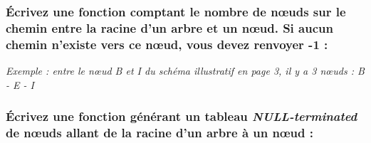 \documentclass[11pt,a4paper]{article}
\begin{document}
%


\subsubsection{\'Ecrivez une fonction comptant le nombre de nœuds sur le chemin entre la racine d'un arbre et un nœud. Si aucun chemin n'existe vers ce nœud, vous devez renvoyer -1 : }

\textit{Exemple : entre le nœud B et I du schéma illustratif en page 3, il y a 3 nœuds : B - E - I}

\medskip




\bigskip

\subsubsection{\'Ecrivez une fonction générant un tableau \textit{NULL-terminated} de nœuds allant de la racine d'un arbre à un nœud : }

\medskip




\bigskip


\end{document}
